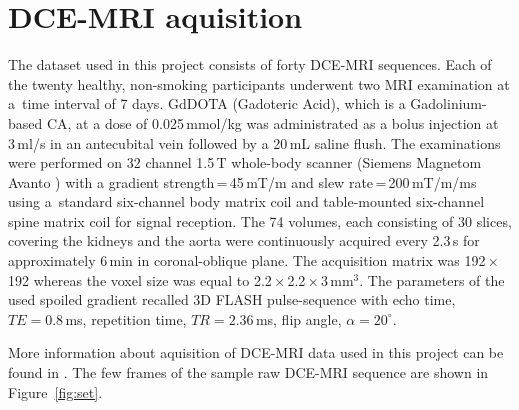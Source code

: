 \section{DCE-MRI aquisition}
The dataset used in this project consists of forty DCE-MRI sequences. Each of the twenty healthy, non-smoking participants underwent two MRI examination at a~time interval of 7 days.
GdDOTA (Gadoteric Acid), which is a Gadolinium-based CA,  at a dose of 0.025\,mmol/kg was administrated as a bolus injection at 3\,ml/s in an antecubital vein followed by a 20\,mL saline flush.
The examinations were performed on 32 channel 1.5\,T whole-body scanner (Siemens Magnetom Avanto \cite{simens}) with a gradient strength\,=\,45\,mT/m and slew rate\,=\,200\,mT/m/ms using a~standard six-channel body matrix coil and table-mounted six-channel spine matrix coil for signal reception.
The 74 volumes, each consisting of 30 slices, covering the kidneys and the aorta were continuously acquired every 2.3\,s for approximately 6\,min in coronal-oblique plane.
The acquisition matrix was 192\,$\times$\,192 whereas the voxel size was equal to 2.2\,$\times$\,2.2\,$\times$\,3\,mm$^3$.
The parameters of the used spoiled gradient recalled 3D FLASH pulse-sequence with echo time, $TE=0.8$\,ms, repetition time, $TR=2.36$\,ms, flip angle, $\alpha= 20^{\circ}$.

More information about aquisition of DCE-MRI data used in this project can be found in \cite{eikefjord2017dynamic}.
The few frames of the sample raw DCE-MRI sequence are shown in Figure~\ref{fig:set}.
\newpage

